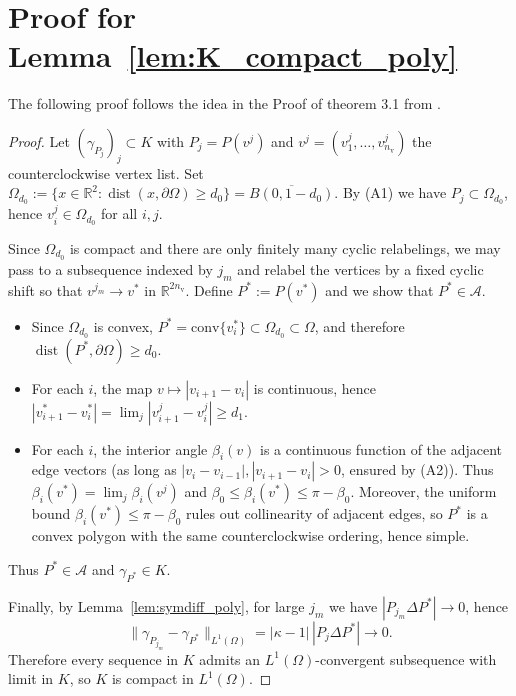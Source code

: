 \documentclass{article}
\newcommand{\R}{\mathbb{R}}
\newcommand{\dist}{\operatorname{dist}}
\begin{document}
\section{Proof for Lemma~\ref{lem:K_compact_poly}}
\label{sec:K_compact_poly}
The following proof follows the idea in the Proof of theorem 3.1 from \cite{alberti2022inverse}.
\begin{proof}
Let $(\gamma_{P_j})_j\subset K$ with $P_j=P(v^j)$ and $v^j=(v^j_1,\dots,v^j_{n_{\mathrm v}})$
the counterclockwise vertex list.
Set $\Omega_{d_0}:=\{x\in\R^2:\dist(x,\partial\Omega)\ge d_0\}=\overline{B(0,1-d_0)}$.
By (A1) we have $P_j\subset \Omega_{d_0}$, hence $v^j_i\in\Omega_{d_0}$ for all $i,j$.

Since $\Omega_{d_0}$ is compact and there are only finitely many cyclic relabelings,
we may pass to a subsequence indexed by $j_m$ and relabel the vertices by a fixed cyclic shift so that $v^{j_m}\to v^\ast$ in $\R^{2n_{\mathrm v}}$.
Define $P^\ast:=P(v^\ast)$ and we show that $P^\ast\in\mathcal A$.
\begin{itemize}
\item[(A1)] Since $\Omega_{d_0}$ is convex, $P^\ast=\mathrm{conv}\{v^\ast_i\}\subset \Omega_{d_0}\subset\Omega$,
and therefore $\dist(P^\ast,\partial\Omega)\ge d_0$.
\item[(A2)] For each $i$, the map $v\mapsto |v_{i+1}-v_i|$ is continuous, hence
$|v^\ast_{i+1}-v^\ast_i|=\lim_j |v^j_{i+1}-v^j_i|\ge d_1$.
\item[(A3)] For each $i$, the interior angle $\beta_i(v)$ is a continuous function of the adjacent edge vectors
(as long as $|v_{i}-v_{i-1}|,|v_{i+1}-v_i|>0$, ensured by (A2)).
Thus $\beta_i(v^\ast)=\lim_j\beta_i(v^j)$ and
$\beta_0\le \beta_i(v^\ast)\le \pi-\beta_0$.
Moreover, the uniform bound $\beta_i(v^\ast)\le\pi-\beta_0$ rules out collinearity of adjacent edges,
so $P^\ast$ is a convex polygon with the same counterclockwise ordering, hence simple.
\end{itemize}
Thus $P^\ast\in\mathcal A$ and $\gamma_{P^\ast}\in K$.

Finally, by Lemma~\ref{lem:symdiff_poly}, for large $j_m$ we have
$|P_{j_m}\Delta P^\ast|\to 0$, hence
\[
\|\gamma_{P_{j_m}}-\gamma_{P^\ast}\|_{L^1(\Omega)}
=|\kappa-1|\,|P_j\Delta P^\ast|\to 0.
\]
Therefore every sequence in $K$ admits an $L^1(\Omega)$-convergent subsequence with limit in $K$,
so $K$ is compact in $L^1(\Omega)$.
\end{proof}
\end{document}
